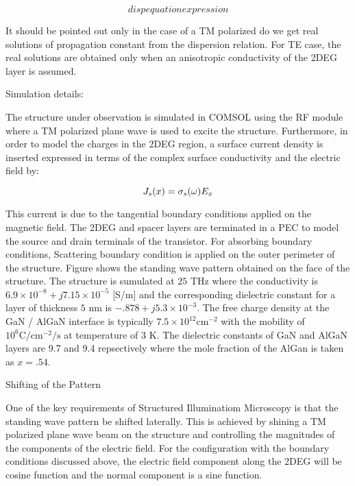 \documentclass[11pt]{article}
\begin{document}
\begin{equation}
  disp equation expression
  \label{eq: dispersion}
\end{equation}

It should be pointed out only in the case of a TM polarized do we get real solutions of propagation constant from the dispersion relation. For TE case, the real solutions are obtained only when an anisotropic conductivity of the 2DEG layer is assumed.

Simulation details:

The structure under observation is simulated in COMSOL using the RF module where a TM polarized plane wave is used to excite the structure. Furthermore, in order to model the charges in the 2DEG region, a surface current density is inserted expressed in terms of the complex surface conductivity and the electric field by:

\begin{equation}
  J_s (x) = \sigma_s(\omega) E_x
  \label{eq:Js}
\end{equation}

This current is due to the tangential boundary conditions applied on the magnetic field. The 2DEG and spacer layers are terminated in a PEC to model the source and drain terminals of the transistor. For absorbing boundary conditions, Scattering boundary condition is applied on the outer perimeter of the structure. Figure shows the standing wave pattern obtained on the face of the structure. The structure is sumulated at $25$ THz where the conductivity is $6.9 \times 10^{-8} + j 7.15 \times 10^{-5}$ [S/m]  and the corresponding dielectric constant for a layer of thickness $5$ nm is $-.878 + j 5.3 \times 10^{-3}$. The free charge density at the GaN / AlGaN interface is typically $7.5 \times 10 ^{12} \mathrm{cm}^{-2}$ with the mobility of $10^{6} \mathrm{C/cm^{-2}/s}$ at temperature of $3$ K. The dielectric constants of GaN and AlGaN layers are 9.7 and 9.4 repsectively where the mole fraction of the AlGan is taken as $x = .54$.

Shifting of the Pattern

One of the key requirements of Structured Illuminatiom Microscopy is that the standing wave pattern be shifted laterally. This is achieved by shining a TM polarized plane wave beam on the structure and controlling the magnitudes of the components of the electric field. For the configuration with the boundary conditions discussed above, the electric field component along the 2DEG will be cosine function and the normal component is a sine function.
\end{document}
